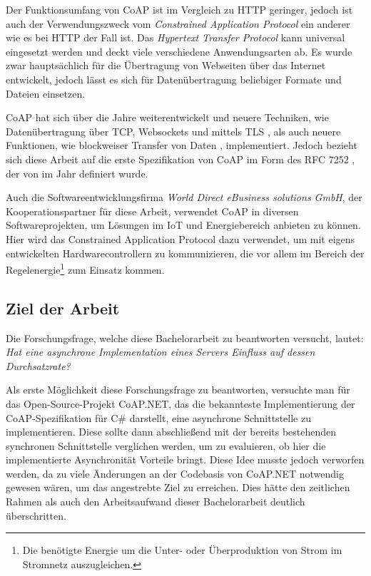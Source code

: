 Der Funktionsumfang von CoAP ist im Vergleich zu HTTP geringer, jedoch ist auch der Verwendungszweck vom \textit{Constrained Application Protocol} ein anderer wie es bei HTTP der Fall ist. Das \textit{Hypertext Transfer Protocol} kann universal eingesetzt werden und deckt viele verschiedene Anwendungsarten ab. Es wurde zwar hauptsächlich für die Übertragung von Webseiten über das Internet entwickelt, jedoch lässt es sich für Datenübertragung beliebiger Formate und Dateien einsetzen.

CoAP hat sich über die Jahre weiterentwickelt und neuere Techniken, wie Datenübertragung über TCP, Websockets und mittels TLS \autocite{RFC8323}, als auch neuere Funktionen, wie blockweiser Transfer von Daten \autocite{RFC7959}, implementiert. Jedoch bezieht sich diese Arbeit auf die erste Spezifikation von CoAP im Form des RFC 7252 \autocite{RFC7252}, der von \citeauthor{RFC7252} im Jahr \citeyear{RFC7252} definiert wurde.

Auch die Softwareentwicklungsfirma \textit{World Direct eBusiness solutions GmbH}, der Kooperationspartner für diese Arbeit, verwendet CoAP in diversen Softwareprojekten, um Lösungen im IoT und Energiebereich anbieten zu können. Hier wird das Constrained Application Protocol dazu verwendet, um mit eigens entwickelten Hardwarecontrollern zu kommunizieren, die vor allem im Bereich der Regelenergie\footnote{Die benötigte Energie um die Unter- oder Überproduktion von Strom im Stromnetz auszugleichen.} zum Einsatz kommen.

\subsection{Ziel der Arbeit}
\label{subsec:ziel-der-arbeit}

Die Forschungsfrage, welche diese Bachelorarbeit zu beantworten versucht, lautet: \textit{Hat eine asynchrone Implementation eines Servers Einfluss auf dessen Durchsatzrate?}

Als erste Möglichkeit diese Forschungsfrage zu beantworten, versuchte man für das Open-Source-Projekt CoAP.NET, das die bekannteste Implementierung der CoAP-Spezifikation für C\# darstellt, eine asynchrone Schnittstelle zu implementieren. Diese sollte dann abschließend mit der bereits bestehenden synchronen Schnittstelle verglichen werden, um zu evaluieren, ob hier die implementierte Asynchronität Vorteile bringt. Diese Idee musste jedoch verworfen werden, da zu viele Änderungen an der Codebasis von CoAP.NET notwendig gewesen wären, um das angestrebte Ziel zu erreichen. Dies hätte den zeitlichen Rahmen als auch den Arbeitsaufwand dieser Bachelorarbeit deutlich überschritten.

